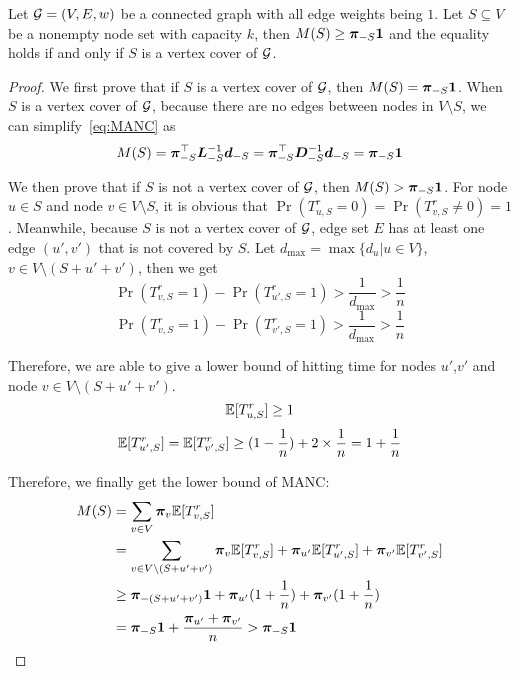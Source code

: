 \documentclass[sigconf]{acmart}
\begin{document}
\begin{lemma}\label{lem:reduct}
    Let \(\mathcal{G}=(V,E,w)\) be a connected graph with all edge weights being \(1\). Let \(S\subseteq V\) be a nonempty node set with capacity \(k\), then \(M(S)\ge \boldsymbol{\pi}_{-S}\boldsymbol{1}\) and the equality holds if and only if \(S\) is a vertex cover of \(\mathcal{G}\).
\end{lemma}
\begin{proof}
    We first prove that if \(S\) is a vertex cover of \(\mathcal{G}\), then \(M(S)=\boldsymbol{\pi}_{-S}\boldsymbol{1}\).
    When \(S\) is a vertex cover of \(\mathcal{G}\), because there are no edges between nodes in \(V\setminus S\), we can simplify~\eqref{eq:MANC} as
    \[M(S)=\boldsymbol{\pi}_{-S}^\top\boldsymbol{L}_{-S}^{-1}\boldsymbol{d}_{-S}=\boldsymbol{\pi}_{-S}^\top\boldsymbol{D}_{-S}^{-1}\boldsymbol{d}_{-S}=\boldsymbol{\pi}_{-S}\boldsymbol{1}\]

    We then prove that if \(S\) is not a vertex cover of \(\mathcal{G}\), then \(M(S)>\boldsymbol{\pi}_{-S}\boldsymbol{1}\).
    For node \(u\in S\) and node \(v\in V\setminus S\), it is obvious that \(\Pr(T_{u,S}^r=0)=\Pr(T_{v,S}^r\neq0)=1\).
    Meanwhile, because \(S\) is not a vertex cover of \(\mathcal{G}\), edge set \(E\) has at least one edge \((u',v')\) that is not covered by \(S\).
    Let \(d_{\max}=\max\{d_u|u\in V\}\),\(v\in V\setminus(S+u'+v')\), then we get
    \[\Pr(T_{v,S}^r=1)-\Pr(T_{u',S}^r=1)>\frac{1}{d_{\max}}>\frac{1}{n}\]
    \[\Pr(T_{v,S}^r=1)-\Pr(T_{v',S}^r=1)>\frac{1}{d_{\max}}>\frac{1}{n}\]

    Therefore, we are able to give a lower bound of hitting time for nodes \(u'\),\(v'\) and node \(v\in V\setminus(S+u'+v')\).
    \[\mathbb{E}[T_{u,S}^r]\ge1\]
    \[\mathbb{E}[T_{u',S}^r]=\mathbb{E}[T_{v',S}^r]\ge(1-\frac1n)+2\times\frac1n=1+\frac1n\]

    Therefore, we finally get the lower bound of MANC:
    \begin{align*}
        M(S) & =\sum_{v\in V}\boldsymbol{\pi}_v\mathbb{E}[T_{v,S}^r]                                                                             \\
             & =\sum_{v\in V\setminus(S+u'+v')}\boldsymbol{\pi}_v\mathbb{E}[T_{v,S}^r]+\boldsymbol{\pi}_{u'}\mathbb{E}[T_{u',S}^r]+\boldsymbol{\pi}_{v'}\mathbb{E}[T_{v',S}^r] \\
             & \ge\boldsymbol{\pi}_{-(S+u'+v')}\boldsymbol{1}+\boldsymbol{\pi}_{u'}(1+\frac1n)+\boldsymbol{\pi}_{v'}(1+\frac1n)                                        \\
             & =\boldsymbol{\pi}_{-S}\boldsymbol{1}+\frac{\boldsymbol{\pi}_{u'}+\boldsymbol{\pi}_{v'}}n>\boldsymbol{\pi}_{-S}\boldsymbol{1}
    \end{align*}
\end{proof}
\end{document}
